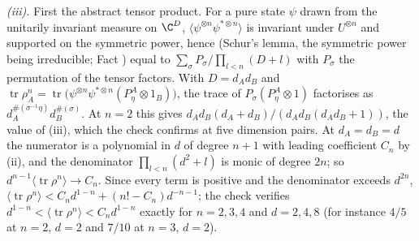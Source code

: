 \emph{(iii).} First the abstract tensor product. For a pure state $\psi$ drawn from the unitarily invariant measure on $\C^{D}$, $\langle \psi^{\otimes n}\psi^{*\otimes n}\rangle$ is invariant under $U^{\otimes n}$ and supported on the symmetric power, hence (Schur's lemma, the symmetric power being irreducible; Fact ) equal to $\sum_{\sigma}P_{\sigma}/\prod_{l<n}(D + l)$ with $P_{\sigma}$ the permutation of the tensor factors. With $D = d_{A}d_{B}$ and $\operatorname{tr}\rho_{A}^{n} = \operatorname{tr}\bigl(\psi^{\otimes n}\psi^{*\otimes n}(P^{A}_{\eta} \otimes 1_{B})\bigr)$, the trace of $P_{\sigma}(P^{A}_{\eta}\otimes 1)$ factorises as $d_{A}^{\#(\sigma^{-1}\eta)}d_{B}^{\#(\sigma)}$. At $n = 2$ this gives $d_{A}d_{B}(d_{A} + d_{B})/(d_{A}d_{B}(d_{A}d_{B} + 1))$, the value of (iii), which the check confirms at five dimension pairs. At $d_{A} = d_{B} = d$ the numerator is a polynomial in $d$ of degree $n + 1$ with leading coefficient $C_{n}$ by (ii), and the denominator $\prod_{l<n}(d^{2} + l)$ is monic of degree $2n$; so $d^{n-1}\langle\operatorname{tr}\rho^{n}\rangle \to C_{n}$. Since every term is positive and the denominator exceeds $d^{2n}$, $\langle\operatorname{tr}\rho^{n}\rangle < C_{n}d^{1-n} + (n! - C_{n})d^{-n-1}$; the check verifies $d^{1-n} < \langle\operatorname{tr}\rho^{n}\rangle < C_{n}d^{1-n}$ exactly for $n = 2, 3, 4$ and $d = 2, 4, 8$ (for instance $4/5$ at $n = 2$, $d = 2$ and $7/10$ at $n = 3$, $d = 2$).

